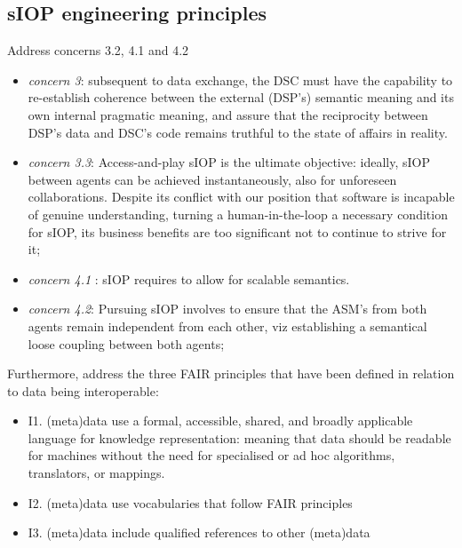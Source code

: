 \documentclass[sort&compress,preprint,authoryear,3p,twocolumn]{elsarticle}
\providecommand{\tightlist}{%
  \setlength{\itemsep}{0pt}\setlength{\parskip}{0pt}}
\begin{document}
\hypertarget{siop-engineering-principles}{%
\subsection{sIOP engineering
principles}\label{siop-engineering-principles}}

Address concerns 3.2, 4.1 and 4.2

\begin{itemize}
\item
  \emph{concern 3}: subsequent to data exchange, the DSC must have the
  capability to re-establish coherence between the external (DSP's)
  semantic meaning and its own internal pragmatic meaning, and assure
  that the reciprocity between DSP's data and DSC's code remains
  truthful to the state of affairs in reality.
\item
  \emph{concern 3.3}: Access-and-play sIOP is the ultimate objective:
  ideally, sIOP between agents can be achieved instantaneously, also for
  unforeseen collaborations. Despite its conflict with our position that
  software is incapable of genuine understanding, turning a
  human-in-the-loop a necessary condition for sIOP, its business
  benefits are too significant not to continue to strive for it;
\item
  \emph{concern 4.1} : sIOP requires to allow for scalable semantics.
\item
  \emph{concern 4.2}: Pursuing sIOP involves to ensure that the ASM's
  from both agents remain independent from each other, viz establishing
  a semantical loose coupling between both agents;
\end{itemize}

Furthermore, address the three FAIR principles that have been defined in
relation to data being interoperable:

\begin{itemize}
\tightlist
\item
  I1. (meta)data use a formal, accessible, shared, and broadly
  applicable language for knowledge representation: meaning that data
  should be readable for machines without the need for specialised or ad
  hoc algorithms, translators, or mappings.
\item
  I2. (meta)data use vocabularies that follow FAIR principles
\item
  I3. (meta)data include qualified references to other (meta)data
\end{itemize}
\end{document}
